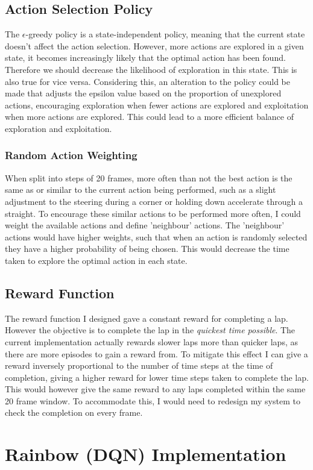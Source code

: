 \subsection{Action Selection Policy}
The $\epsilon$-greedy policy is a state-independent policy, meaning that the current state doesn't affect the action selection. However, more actions are explored in a given state, it becomes increasingly likely that the optimal action has been found. Therefore we should decrease the likelihood of exploration in this state. This is also true for vice versa. Considering this, an alteration to the policy could be made that adjusts the epsilon value based on the proportion of unexplored actions, encouraging exploration when fewer actions are explored and exploitation when more actions are explored. This could lead to a more efficient balance of exploration and exploitation.
\subsubsection{Random Action Weighting}
When split into steps of 20 frames, more often than not the best action is the same as or similar to the current action being performed, such as a slight adjustment to the steering during a corner or holding down accelerate through a straight. To encourage these similar actions to be performed more often, I could weight the available actions and define 'neighbour' actions. The 'neighbour' actions would have higher weights, such that when an action is randomly selected they have a higher probability of being chosen. This would decrease the time taken to explore the optimal action in each state.
\subsection{Reward Function}
The reward function I designed gave a constant reward for completing a lap. However the objective is to complete the lap in the \textit{quickest time possible}. The current implementation actually rewards slower laps more than quicker laps, as there are more episodes to gain a reward from. To mitigate this effect I can give a reward inversely proportional to the number of time steps at the time of completion, giving a higher reward for lower time steps taken to complete the lap. This would however give the same reward to any laps completed within the same 20 frame window. To accommodate this, I would need to redesign my system to check the completion on every frame.
\section{Rainbow (DQN) Implementation}
